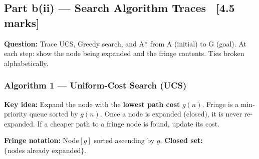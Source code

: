 \documentclass[12pt, a4paper]{article}
\newenvironment{solutionbox}{\begin{mdframed}[style=solutionframe]}{\end{mdframed}}
\begin{document}
\subsection{Part b(ii) — Search Algorithm Traces \ [4.5 marks]}

\begin{solutionbox}
\textbf{Question:} Trace UCS, Greedy search, and A* from A (initial) to G (goal).
At each step: show the node being expanded and the fringe contents.
Ties broken alphabetically.
\end{solutionbox}

\vspace{0.7em}

\subsubsection*{Algorithm 1 — Uniform-Cost Search (UCS)}

\textbf{Key idea:} Expand the node with the \textbf{lowest path cost} $g(n)$. Fringe is a min-priority queue sorted by $g(n)$.
Once a node is expanded (closed), it is never re-expanded. If a cheaper path to a fringe node is found, update its cost.

\textbf{Fringe notation:} Node$[g]$ sorted ascending by $g$.
\textbf{Closed set:} $\{\text{nodes already expanded}\}$.
\end{document}
